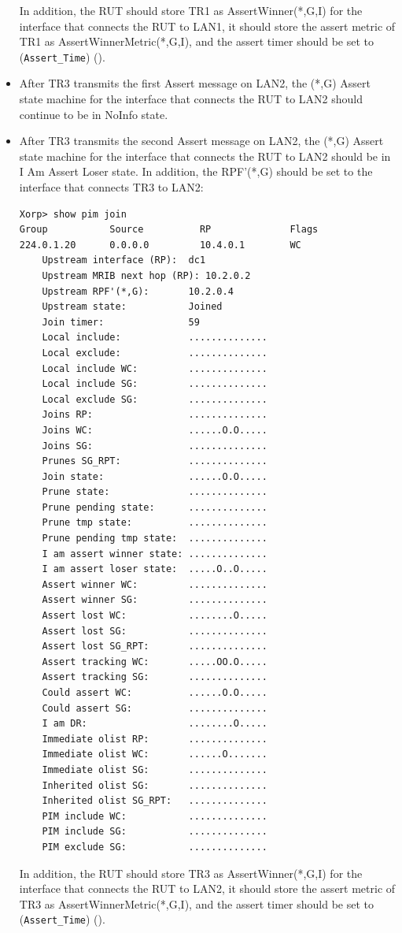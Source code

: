 \documentclass[11pt]{report}
\begin{document}
\begin{itemize}
  In addition, the RUT should store TR1 as AssertWinner(*,G,I) for the
  interface that connects the RUT to LAN1, it should store the assert metric
  of TR1 as AssertWinnerMetric(*,G,I), and the assert timer should be set to
  (\verb=Assert_Time=) ({\PimsmAssertTime}).

  \item After TR3 transmits the first Assert message on LAN2, the (*,G) Assert
  state machine for the interface that connects the RUT to LAN2 should
  continue to be in NoInfo state.

  \item After TR3 transmits the second Assert message on LAN2, the (*,G) Assert
  state machine for the interface that connects the RUT to LAN2 should be in I
  Am Assert Loser state. In addition,
  the RPF'(*,G) should be set to the interface that connects TR3
  to LAN2:

\begin{verbatim}
Xorp> show pim join 
Group           Source          RP              Flags
224.0.1.20      0.0.0.0         10.4.0.1        WC   
    Upstream interface (RP):  dc1
    Upstream MRIB next hop (RP): 10.2.0.2
    Upstream RPF'(*,G):       10.2.0.4
    Upstream state:           Joined 
    Join timer:               59
    Local include:            ..............
    Local exclude:            ..............
    Local include WC:         ..............
    Local include SG:         ..............
    Local exclude SG:         ..............
    Joins RP:                 ..............
    Joins WC:                 ......O.O.....
    Joins SG:                 ..............
    Prunes SG_RPT:            ..............
    Join state:               ......O.O.....
    Prune state:              ..............
    Prune pending state:      ..............
    Prune tmp state:          ..............
    Prune pending tmp state:  ..............
    I am assert winner state: ..............
    I am assert loser state:  .....O..O.....
    Assert winner WC:         ..............
    Assert winner SG:         ..............
    Assert lost WC:           ........O.....
    Assert lost SG:           ..............
    Assert lost SG_RPT:       ..............
    Assert tracking WC:       .....OO.O.....
    Assert tracking SG:       ..............
    Could assert WC:          ......O.O.....
    Could assert SG:          ..............
    I am DR:                  ........O.....
    Immediate olist RP:       ..............
    Immediate olist WC:       ......O.......
    Immediate olist SG:       ..............
    Inherited olist SG:       ..............
    Inherited olist SG_RPT:   ..............
    PIM include WC:           ..............
    PIM include SG:           ..............
    PIM exclude SG:           ..............
\end{verbatim}

  In addition, the RUT should store TR3 as AssertWinner(*,G,I) for the
  interface that connects the RUT to LAN2, it should store the assert metric
  of TR3 as AssertWinnerMetric(*,G,I), and the assert timer should be set to
  (\verb=Assert_Time=) ({\PimsmAssertTime}).

\end{itemize}
\end{document}
